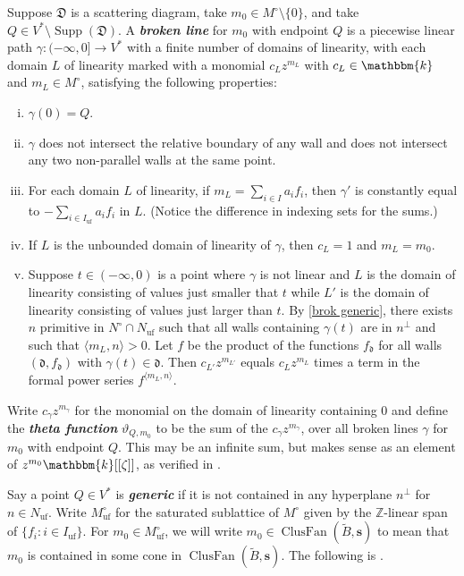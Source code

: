 \documentclass{amsart}
\theoremstyle{definition}
\theoremstyle{remark}
\numberwithin{equation}{section}
\newcommand{\newword}[1]{\textbf{\emph{#1}}}
\newcommand{\integers}{\mathbb Z}
\newcommand{\thet}{\vartheta}
\newcommand{\uf}{{\operatorname{uf}}}
\newcommand{\set}[1]{{\lbrace #1 \rbrace}}
\newcommand{\br}[1]{{\langle #1 \rangle}}
\newcommand{\D}{{\mathfrak D}}
\newcommand{\0}{{\mathbf{0}}}
\newcommand{\s}{\mathbf{s}}
\renewcommand{\k}{\mathbbm{k}}
\newcommand{\tB}{\tilde{B}}
\newcommand{\Supp}{\operatorname{Supp}}
\newcommand{\ClusFan}{\operatorname{ClusFan}}
\renewcommand{\d}{{\mathfrak d}}
\begin{document}
Suppose $\D$ is a scattering diagram, take $m_0\in M^\circ\setminus\set{0}$, and take $Q\in V^*\setminus\Supp(\D)$.
A \newword{broken line} for $m_0$ with endpoint $Q$ is a piecewise linear path $\gamma:(-\infty,0]\to V^*$ with a finite number of domains of linearity, with each domain $L$ of linearity marked with a monomial $c_Lz^{m_L}$ with $c_L\in\k$ and $m_L\in M^\circ$, satisfying the following properties:
\begin{enumerate}[(i)]
\item $\gamma(0)=Q$.
\item \label{brok generic}
$\gamma$ does not intersect the relative boundary of any wall and does not intersect any two non-parallel walls at the same point. 
\item For each domain $L$ of linearity, if $m_L=\sum_{i\in I}a_if_i$, then $\gamma'$ is constantly equal to $-\sum_{i\in I_\uf}a_if_i$ in $L$.
(Notice the difference in indexing sets for the sums.)
\item If $L$ is the unbounded domain of linearity of $\gamma$, then $c_L=1$ and $m_L=m_0$.
\item Suppose $t\in(-\infty,0)$ is a point where $\gamma$ is not linear and $L$ is the domain of linearity consisting of values just smaller that $t$ while $L'$ is the domain of linearity consisting of values just larger than $t$.
By \eqref{brok generic}, there exists $n$ primitive in $N^\circ\cap N_\uf$ such that all walls containing $\gamma(t)$ are in $n^\perp$ and such that $\br{m_L,n}>0$.
Let $f$ be the product of the functions $f_\d$ for all walls $(\d,f_\d)$ with $\gamma(t)\in\d$.
Then $c_{L'}z^{m_{L'}}$ equals $c_Lz^{m_L}$ times a term in the formal power series $f^{\br{m_L,n}}$.
\end{enumerate}
Write $c_\gamma z^{m_\gamma}$ for the monomial on the domain of linearity containing $0$ and define the \newword{theta function} $\thet_{Q,m_0}$ to be the sum of the $c_\gamma z^{m_\gamma}$, over all broken lines $\gamma$ for $m_0$ with endpoint $Q$.
This may be an infinite sum, but makes sense as an element of $z^{m_0}\k[[\zeta]]$, as verified in \cite[Proposition~3.4]{GHKK}.

Say a point $Q\in V^*$ is \newword{generic} if it is not contained in any hyperplane $n^\perp$ for $n\in N_\uf$.
Write $M^\circ_\uf$ for the saturated sublattice of $M^\circ$ given by the $\integers$-linear span of $\set{f_i:i\in I_\uf}$.
For $m_0\in M_\uf^\circ$, we will write $m_0\in\ClusFan(\tB,\s)$ to mean that $m_0$ is contained in some cone in $\ClusFan(\tB,\s)$.
The following is \cite[Theorem~4.9]{GHKK}.
\end{document}
